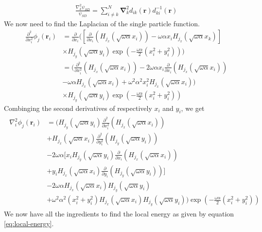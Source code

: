 \documentclass[11pt]{article}
\begin{document}
\begin{align}
	\frac{\nabla^2_k\psi_{SD}}{\psi_{SD}} = \sum_{i\neq k}^N\bm{\nabla}^2_k d_{ik}(\mathbf{r})d_{ki}^{-1}(\mathbf{r})
	\label{eq:laplacian-slater}
\end{align}
We now need to find the Laplacian of the single particle function.
\begin{align*}
	\frac{\partial^2}{\partial x_i^2} \phi_j(\mathbf{r}_i) &= \frac{\partial}{\partial x_i} \bigg(\left[ \frac{\partial}{\partial x_i}\left( H_{j_x} (\sqrt{\omega\alpha}x_i) \right) - \omega\alpha x_i H_{j_x} (\sqrt{\omega\alpha}x_k) \right] \\
	&\times H_{j_y} (\sqrt{\omega\alpha} y_i)\exp{\left(-\frac{\omega\alpha}{2}\left( x_i^2 + y_i^2 \right)\right)} \bigg) \\
	&= \bigg( \frac{\partial^2}{\partial x_i^2} \left( H_{j_x} (\sqrt{\omega\alpha}x_i) \right) - 2\omega\alpha x_i \frac{\partial}{\partial x_i}\left( H_{j_x} (\sqrt{\omega\alpha}x_i) \right) \\ 
	&- \omega \alpha H_{j_x} (\sqrt{\omega\alpha}x_i) + \omega^2 \alpha^2 x_i^2 H_{j_x} (\sqrt{\omega\alpha}x_i) \bigg) \\
	&\times H_{j_y} (\sqrt{\omega\alpha} y_i) \exp{\left(-\frac{\omega\alpha}{2}\left( x_i^2 + y_i^2 \right)\right)}
\end{align*}
Combinging the second derivatives of respectively $x_i$ and $y_i$, we get
\begin{align}
	\begin{split}
		\nabla_i^2 \phi_j(\mathbf{r}_i) &= \bigg(
			H_{j_y} (\sqrt{\omega\alpha} y_i) \frac{\partial^2}{\partial x_i^2} \left( H_{j_x} (\sqrt{\omega\alpha}x_i) \right) \\
			&+ H_{j_x} (\sqrt{\omega\alpha}x_i) \frac{\partial^2}{\partial y_i^2} \left( H_{j_y} (\sqrt{\omega\alpha}y_i) \right) \\
			&- 2\omega\alpha \bigg[ x_i H_{j_y} (\sqrt{\omega\alpha} y_i) \frac{\partial}{\partial x_i}\left( H_{j_x} (\sqrt{\omega\alpha}x_i) \right) \\
			&+ y_i H_{j_x} (\sqrt{\omega\alpha}x_i) \frac{\partial}{\partial y_i}\left( H_{j_y} (\sqrt{\omega\alpha}y_i) \right) \bigg] \\
			&- 2\omega\alpha H_{j_x} (\sqrt{\omega\alpha}x_i) H_{j_y} (\sqrt{\omega\alpha} y_i) \\
			&+ \omega^2 \alpha^2(x_i^2+y_i^2) H_{j_x} (\sqrt{\omega\alpha}x_i) H_{j_y} (\sqrt{\omega\alpha} y_i)
		\bigg) \exp{\left(-\frac{\omega\alpha}{2}\left( x_i^2 + y_i^2 \right)\right)}
	\end{split}
	\label{eq:wf-sp-laplacian}
\end{align}
We now have all the ingredients to find the local energy as given by equation \eqref{eq:local-energy}.
\end{document}
